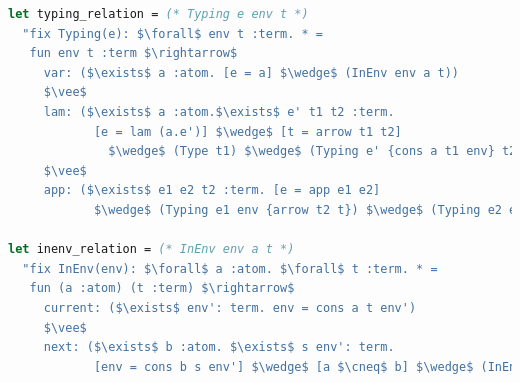 \documentclass[aspectratio=169]{beamer}
\begin{document}
\begin{frame}[fragile]
\begin{lstlisting}[mathescape,language=OCaml,escapebegin=\color{codepurple}]
let typing_relation = (* Typing e env t *)
  "fix Typing(e): $\forall$ env t :term. * =
   fun env t :term $\rightarrow$
     var: ($\exists$ a :atom. [e = a] $\wedge$ (InEnv env a t))
     $\vee$
     lam: ($\exists$ a :atom.$\exists$ e' t1 t2 :term.
            [e = lam (a.e')] $\wedge$ [t = arrow t1 t2]
              $\wedge$ (Type t1) $\wedge$ (Typing e' {cons a t1 env} t2))
     $\vee$
     app: ($\exists$ e1 e2 t2 :term. [e = app e1 e2]
            $\wedge$ (Typing e1 env {arrow t2 t}) $\wedge$ (Typing e2 env t2))"

let inenv_relation = (* InEnv env a t *)
  "fix InEnv(env): $\forall$ a :atom. $\forall$ t :term. * =
   fun (a :atom) (t :term) $\rightarrow$
     current: ($\exists$ env': term. env = cons a t env')
     $\vee$
     next: ($\exists$ b :atom. $\exists$ s env': term.
            [env = cons b s env'] $\wedge$ [a $\cneq$ b] $\wedge$ (InEnv env' a t))"
\end{lstlisting}
\end{frame}
\end{document}
